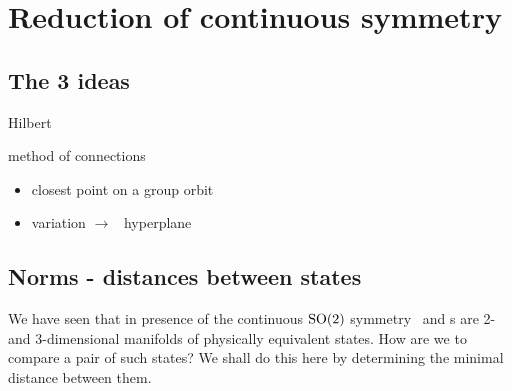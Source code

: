 

\section{Reduction of continuous symmetry}
\label{s:slice}

\subsection{The 3 ideas}

 Hilbert

 method of connections

 \mslices

    \begin{itemize}
      \item closest point on a group orbit
      \item variation $\to$ \slice\ hyperplane
    \end{itemize}

\subsection{Norms - distances between states}

We have seen that in presence of the continuous $\textrm{SO}(2)$ symmetry
\reqva\ and \rpo s are 2- and 3-dimensional manifolds of physically
equivalent states. How are we to compare a pair of such states? We shall
do this here by determining the minimal distance between them.

